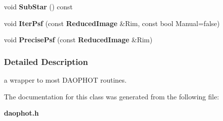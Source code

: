 \begin{CompactItemize}
\item 
{}
void {\bf Sub\-Star} () const\label{class_daophot_a19}

\item 
{}
void {\bf Iter\-Psf} (const {\bf Reduced\-Image} \&Rim, const bool Manual=false)\label{class_daophot_a20}

\item 
{}
void {\bf Precise\-Psf} (const {\bf Reduced\-Image} \&Rim)\label{class_daophot_a21}

\end{CompactItemize}


\subsubsection{Detailed Description}
a wrapper to most DAOPHOT routines.



The documentation for this class was generated from the following file:\begin{CompactItemize}
\item 
{\bf daophot.h}\end{CompactItemize}

